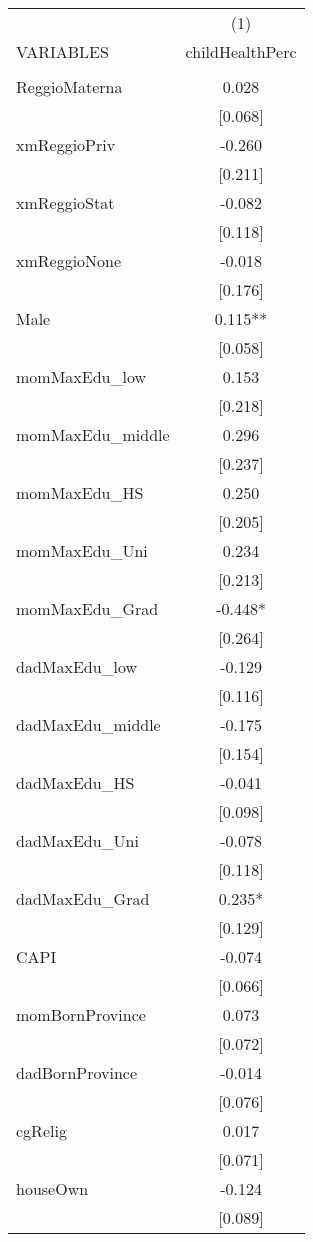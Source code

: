 \documentclass[]{article}
\begin{document}
\begin{tabular}{lc} \hline
 & (1) \\
VARIABLES & childHealthPerc \\ \hline
 &  \\
ReggioMaterna & 0.028 \\
 & [0.068] \\
xmReggioPriv & -0.260 \\
 & [0.211] \\
xmReggioStat & -0.082 \\
 & [0.118] \\
xmReggioNone & -0.018 \\
 & [0.176] \\
Male & 0.115** \\
 & [0.058] \\
momMaxEdu\_low & 0.153 \\
 & [0.218] \\
momMaxEdu\_middle & 0.296 \\
 & [0.237] \\
momMaxEdu\_HS & 0.250 \\
 & [0.205] \\
momMaxEdu\_Uni & 0.234 \\
 & [0.213] \\
momMaxEdu\_Grad & -0.448* \\
 & [0.264] \\
dadMaxEdu\_low & -0.129 \\
 & [0.116] \\
dadMaxEdu\_middle & -0.175 \\
 & [0.154] \\
dadMaxEdu\_HS & -0.041 \\
 & [0.098] \\
dadMaxEdu\_Uni & -0.078 \\
 & [0.118] \\
dadMaxEdu\_Grad & 0.235* \\
 & [0.129] \\
CAPI & -0.074 \\
 & [0.066] \\
momBornProvince & 0.073 \\
 & [0.072] \\
dadBornProvince & -0.014 \\
 & [0.076] \\
cgRelig & 0.017 \\
 & [0.071] \\
houseOwn & -0.124 \\
 & [0.089] \\

\end{tabular}
\end{document}
